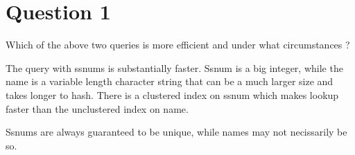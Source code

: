 \section*{Question 1}
Which of the above two queries is more efficient and under what circumstances ?

The query with ssnums is substantially faster.
Ssnum is a big integer, while the name is a variable length character string that can be a much larger size and takes longer to hash.
There is a clustered index on ssnum which makes lookup faster than the unclustered index on name.

Ssnums are always guaranteed to be unique, while names may not necissarily be so.

